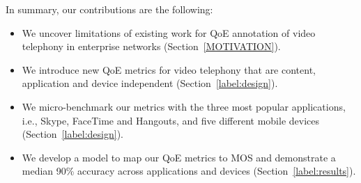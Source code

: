 In summary, our contributions are the following:
\begin{itemize}[leftmargin=*]
    \item We uncover limitations of existing work for QoE annotation of video telephony in enterprise networks (Section~\ref{MOTIVATION}).
    \item We introduce new QoE metrics for video telephony that are content, application and device independent (Section~\ref{label:design}).
    \item We micro-benchmark our metrics with the three most popular applications, i.e., Skype, FaceTime and Hangouts, and five different mobile devices (Section~\ref{label:design}).
    \item We develop a model to map our QoE metrics to MOS and demonstrate a median 90\% accuracy across applications and devices (Section~\ref{label:results}).
\end{itemize}
